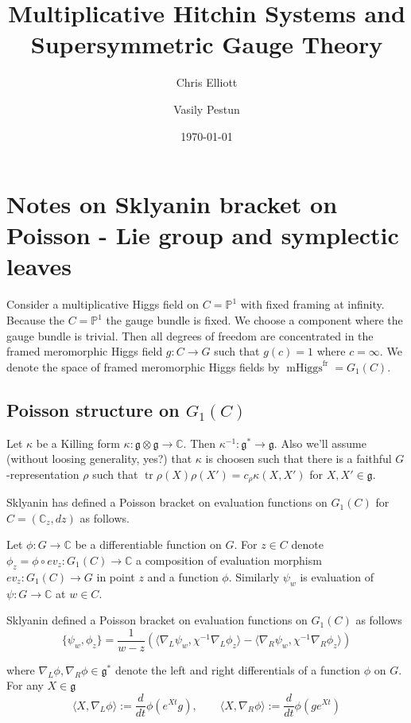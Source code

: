 \documentclass[11pt, oneside, reqno]{amsart}
\title{Multiplicative Hitchin Systems and Supersymmetric Gauge Theory}
\author{Chris Elliott \and Vasily Pestun}
\date{\today}
\theoremstyle{definition} \newtheorem{definition}{Definition}[section]
\theoremstyle{definition} \newtheorem{remark}[definition]{Remark}
\theoremstyle{definition} \newtheorem{remarks}[definition]{Remarks}
\theoremstyle{definition} \newtheorem{question}[definition]{Question}
\theoremstyle{definition} \newtheorem*{note}{Note}
\theoremstyle{definition} \newtheorem{example}[definition]{Example}
\theoremstyle{definition} \newtheorem{examples}[definition]{Examples}
\renewcommand{\gg}{\mathfrak{g}}
\DeclareMathOperator{\tr}{tr}
\DeclareMathOperator{\mhiggs}{mHiggs}
\newcommand{\fr}{\mathrm{fr}}
\begin{document}
\section{Notes on Sklyanin bracket on Poisson - Lie group
  and symplectic leaves}

Consider a multiplicative Higgs field on $C = \mathbb{P}^{1}$
with fixed framing at infinity. Because the $C = \mathbb{P}^{1}$ the
gauge bundle is fixed. We choose a component where the gauge bundle is trivial.
Then all degrees of freedom are concentrated
in the framed meromorphic Higgs field $g: C \to G$ such that $g(c) = 1$ where $c = \infty$. We denote
the space of framed meromorphic Higgs fields by $\mhiggs^{\fr} = G_1(C)$. 

\subsection{Poisson structure on $G_1(C)$} 
Let $\kappa$ be a Killing form $\kappa: \gg \otimes \gg \to \mathbb{C}$.
Then $\kappa^{-1}: \gg^{*} \to \gg$. Also we'll assume  (without loosing generality, yes?)
that $\kappa$ is choosen such that
there is a faithful $G$-representation $\rho$ such that 
$\tr\rho(X) \rho(X') = c_\rho \kappa(X, X') $ for $X , X' \in \gg$. 

Sklyanin has defined a Poisson bracket on evaluation functions on $G_1(C)$ for $C = (\mathbb{C}_z, dz)$ as follows. 

Let $\phi: G \to \mathbb{C}$ be a differentiable function on $G$. For $z \in C$
denote $\phi_{z} =  \phi \circ ev_{z} : G_1(C) \to \mathbb{C}$ a composition
of evaluation morphism  $ev_{z}: G_1(C) \to G$ in point $z$ and a function $\phi$.
Similarly $\psi_{w}$ is evaluation of $\psi: G \to \mathbb{C}$ at $w \in C$.

Sklyanin defined a Poisson bracket on evaluation functions on $G_1(C)$ as follows
\begin{equation}
\label{eq:Sklyanin}
  \{ \psi_{w}, \phi_{z} \} = \frac{1}{w - z}(\langle \nabla_{L} \psi_w, \chi^{-1} \nabla_{L} \phi_{z}
\rangle  - \langle \nabla_{R} \psi_{w},  \chi^{-1} \nabla_{R} \phi_{z}\rangle)
\end{equation}

where $\nabla_{L}\phi , \nabla_{R}\phi \in \gg^{*} $ denote the left and right differentials
of a function $\phi$ on $G$. For any $X \in \gg$
\begin{equation}
  \langle X, \nabla_{L} \phi \rangle := \frac{d}{dt} \phi(e^{Xt} g),
  \qquad \langle X, \nabla_{R} \phi \rangle := \frac{d}{dt} \phi(g e^{Xt})
\end{equation}
\end{document}
